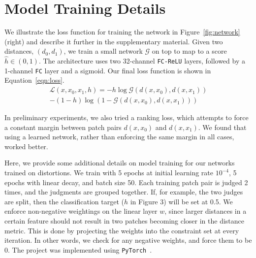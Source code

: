 \section{Model Training Details}
\label{sec:train}

We illustrate the loss function for training the network in Figure~\ref{fig:network} (right) and describe it further in the supplementary material. Given two distances, $(d_0, d_1)$, we train a small network $\mathcal{G}$ on top to map to a score $\hat{h}\in(0,1)$. The architecture uses two 32-channel \texttt{FC-ReLU} layers, followed by a 1-channel \texttt{FC} layer and a sigmoid. Our final loss function is shown in Equation~\ref{eqn:loss}.
\begin{equation}
\begin{split}
    \mathcal{L}(x,x_0,x_1,h)= - h \log \mathcal{G}(d(x,x_0),d(x,x_1)) \\ - (1-h) \log (1-\mathcal{G}(d(x,x_0),d(x,x_1)))
\end{split}
\label{eqn:loss}
\end{equation}

In preliminary experiments, we also tried a ranking loss, which attempts to force a constant margin between  patch pairs $d(x,x_0)$ and $d(x,x_1)$. We found that using a learned network, rather than enforcing the same margin in all cases, worked better.

Here, we provide some additional details on model training for our networks trained on distortions. We train with 5 epochs at initial learning rate $10^{-4}$, 5 epochs with linear decay, and batch size 50. Each training patch pair is judged 2 times, and the judgments are grouped together. If, for example, the two judges are split, then the classification target ($h$ in Figure 3) will be set at 0.5. We enforce non-negative weightings on the linear layer $w$, since larger distances in a certain feature should not result in two patches becoming closer in the distance metric. This is done by projecting the weights into the constraint set at every iteration. In other words, we check for any negative weights, and force them to be 0. The project was implemented using \texttt{PyTorch}~\cite{paszkepytorch}.

